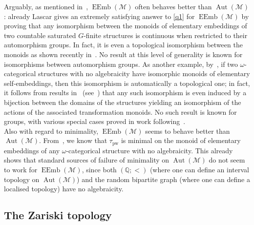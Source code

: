 \documentclass{article}
\theoremstyle{remark}
\theoremstyle{definition}
\DeclareMathOperator{\Aut}{Aut}
\DeclareMathOperator{\EEmb}{EEmb}
\newcommand{\M}[0]{\mathcal{M}}
\newcommand{\pw}[0]{\tau_{\mathrm{pw}}}
\begin{document}
Arguably, as mentioned in~\cite{marimon2025guide}, $\EEmb(\M)$ often behaves better than $\Aut(\M)$: already Lascar gives an extremely satisfying answer to \cref{q1} for $\EEmb(\M)$ by proving that any isomorphism between the monoids of  elementary embeddings of two countable saturated $G$-finite structures is continuous when restricted to their automorphism groups. In fact, it is even a topological isomorphism between the monoids as shown recently  in~\cite{marimon2025guide}. No result at this level of generality is known for isomorphisms between  automorphism groups. %
As another example, by~\cite[Theorem~3.2]{pinskerschindler},  if two $\omega$-categorical structures with no algebraicity have isomorphic monoids
of elementary self-embeddings, then this isomorphism is automatically a topological one; in fact, it follows from results in~\cite{Rubin} (see~\cite[Theorem~58]{marimon2025guide}) that any such 
isomorphism is even induced by %
a bijection between the domains of the structures yielding an isomorphism of the actions of the associated transformation monoids. %
No such result is known for groups, with various special cases proved in work following~\cite{Rubin}.\\

Also with regard to minimality,  $\EEmb(\M)$ seems to behave better than $\Aut(\M)$.
 From~\cite{pinskerschindler}, we know that $\pw$ is minimal on the monoid of elementary embeddings of any $\omega$-categorical structure with no algebraicity. This  already shows that standard sources of failure of minimality on $\Aut(\M)$ do not seem to work for $\EEmb(\M)$, since both $(\mathbb{Q}; <)$ (where one can define an interval topology on $\Aut(\M)$)  and the random bipartite graph (where one can define a localised topology) have no algebraicity.

\subsection{The Zariski topology}\label{subsect:Zariski}
\end{document}
